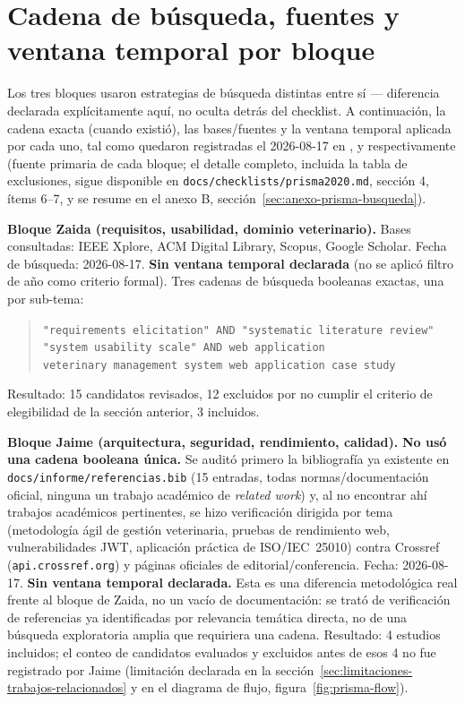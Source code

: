\section{Cadena de búsqueda, fuentes y ventana temporal por bloque}
\label{sec:cadena-busqueda-trabajos-relacionados}

Los tres bloques usaron estrategias de búsqueda distintas entre sí ---
diferencia declarada explícitamente aquí, no oculta detrás del checklist.
A continuación, la cadena exacta (cuando existió), las bases/fuentes y la
ventana temporal aplicada por cada uno, tal como quedaron registradas el
2026-08-17 en ,
 y
respectivamente (fuente primaria de cada bloque; el detalle completo,
incluida la tabla de exclusiones, sigue disponible en
\texttt{docs/checklists/prisma2020.md}, sección 4, ítems 6--7, y se
resume en el anexo B, sección~\ref{sec:anexo-prisma-busqueda}).

\textbf{Bloque Zaida (requisitos, usabilidad, dominio veterinario).}
Bases consultadas: IEEE Xplore, ACM Digital Library, Scopus, Google
Scholar. Fecha de búsqueda: 2026-08-17. \textbf{Sin ventana temporal
declarada} (no se aplicó filtro de año como criterio formal). Tres
cadenas de búsqueda booleanas exactas, una por sub-tema:

\begin{quote}
\texttt{"requirements elicitation" AND "systematic literature review"} \\
\texttt{"system usability scale" AND web application} \\
\texttt{veterinary management system web application case study}
\end{quote}

Resultado: 15 candidatos revisados, 12 excluidos por no cumplir el
criterio de elegibilidad de la sección anterior, 3 incluidos.

\textbf{Bloque Jaime (arquitectura, seguridad, rendimiento, calidad).}
\textbf{No usó una cadena booleana única.} Se auditó primero la
bibliografía ya existente en \texttt{docs/informe/referencias.bib} (15
entradas, todas normas/documentación oficial, ninguna un trabajo
académico de \emph{related work}) y, al no encontrar ahí trabajos
académicos pertinentes, se hizo verificación dirigida por tema
(metodología ágil de gestión veterinaria, pruebas de rendimiento web,
vulnerabilidades JWT, aplicación práctica de ISO/IEC~25010) contra
Crossref (\texttt{api.crossref.org}) y páginas oficiales de
editorial/conferencia. Fecha: 2026-08-17. \textbf{Sin ventana temporal
declarada.} Esta es una diferencia metodológica real frente al bloque de
Zaida, no un vacío de documentación: se trató de verificación de
referencias ya identificadas por relevancia temática directa, no de una
búsqueda exploratoria amplia que requiriera una cadena. Resultado: 4
estudios incluidos; el conteo de candidatos evaluados y excluidos antes
de esos 4 no fue registrado por Jaime (limitación declarada en la
sección~\ref{sec:limitaciones-trabajos-relacionados} y en el diagrama de
flujo, figura~\ref{fig:prisma-flow}).

